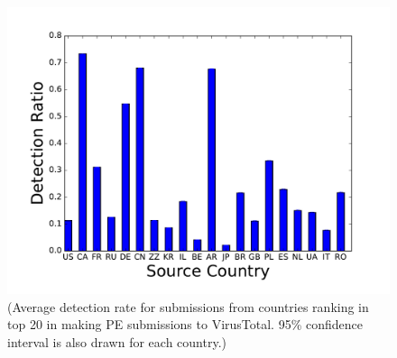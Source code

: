 \begin{figure}[!htb]
\endminipage\hfill
{}%
  \includegraphics[width=\linewidth]{figure/Country}
{\footnotesize{(Average detection rate for submissions from countries ranking 
in top 20 in making PE submissions to VirusTotal. 
95\% confidence interval is also drawn for each country.)}}
\endminipage\hfill

\end{figure}